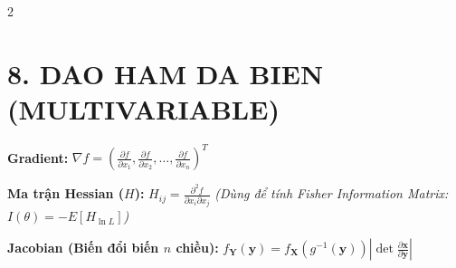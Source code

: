 \documentclass[8pt,a4paper]{article}
\begin{document}
\begin{multicols*}{2}
\section{8. DAO HAM DA BIEN (MULTIVARIABLE)}
\textbf{Gradient:} $\nabla f = (\frac{\partial f}{\partial x_1}, \frac{\partial f}{\partial x_2}, \dots, \frac{\partial f}{\partial x_n})^T$

\textbf{Ma trận Hessian ($H$):} $H_{ij} = \frac{\partial^2 f}{\partial x_i \partial x_j}$
\textit{(Dùng để tính Fisher Information Matrix: $I(\theta) = -E[H_{\ln L}]$)}

\textbf{Jacobian (Biến đổi biến $n$ chiều):}
$f_{\mathbf{Y}}(\mathbf{y}) = f_{\mathbf{X}}(g^{-1}(\mathbf{y})) \left| \det \frac{\partial \mathbf{x}}{\partial \mathbf{y}} \right|$

\end{multicols*}

\pagebreak
\end{document}
